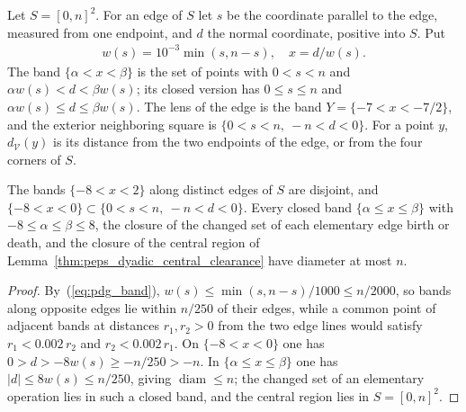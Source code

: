 \begin{definition}
    \label{def:peps_dyadic_edge_band}
    \leanok
    Let $S=[0,n]^2$. For an edge of $S$ let $s$ be the coordinate parallel to the
    edge, measured from one endpoint, and $d$ the normal coordinate, positive
    into $S$. Put
    \begin{align}
        w(s)=10^{-3}\min(s,n-s),\quad x=d/w(s).
        \label{eq:pdg_band}
    \end{align}
    The band $\{\alpha<x<\beta\}$ is the set of points with $0<s<n$ and
    $\alpha w(s)<d<\beta w(s)$; its closed version has $0\le s\le n$ and
    $\alpha w(s)\le d\le\beta w(s)$. The lens of the edge is the band
    $Y=\{-7<x<-7/2\}$, and the exterior neighboring square is
    $\{0<s<n,\ -n<d<0\}$. For a point $y$, $d_{\mathcal V}(y)$ is its distance from
    the two endpoints of the edge, or from the four corners of $S$.
\end{definition}

\begin{lemma}
    \label{lem:peps_dyadic_band_disjoint}
    \leanok
    The bands $\{-8<x<2\}$ along distinct edges of $S$ are disjoint, and
    $\{-8<x<0\}\subset\{0<s<n,\ -n<d<0\}$. Every closed band
    $\{\alpha\le x\le\beta\}$ with $-8\le\alpha\le\beta\le8$, the closure of the
    changed set of each elementary edge birth or death, and the closure of the
    central region of Lemma~\ref{thm:peps_dyadic_central_clearance} have
    diameter at most $n$.
\end{lemma}

\begin{proof}\leanok
    By~(\ref{eq:pdg_band}), $w(s)\le\min(s,n-s)/1000\le n/2000$, so bands along
    opposite edges lie within $n/250$ of their edges, while a common point of
    adjacent bands at distances $r_1,r_2>0$ from the two edge lines would satisfy
    $r_1<0.002\,r_2$ and $r_2<0.002\,r_1$. On $\{-8<x<0\}$ one has
    $0>d>-8w(s)\ge-n/250>-n$. In $\{\alpha\le x\le\beta\}$ one has
    $|d|\le8w(s)\le n/250$, giving $\operatorname{diam}\le n$; the changed set of
    an elementary operation lies in such a closed band, and the central region
    lies in $S=[0,n]^2$.
\end{proof}

